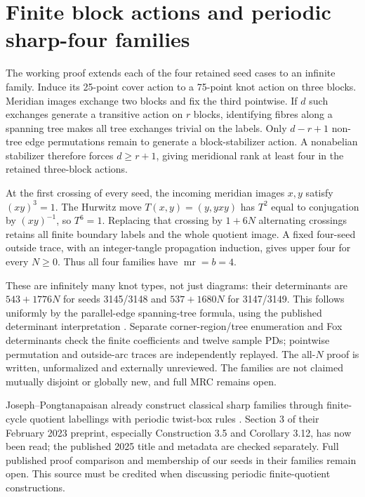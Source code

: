\documentclass[11pt]{article}
\newcommand{\mr}{\operatorname{mr}}
\begin{document}
\section{Finite block actions and periodic sharp-four families}

The working proof  extends
each of the four retained seed cases to an infinite family.
Induce its 25-point cover action to a 75-point knot action
on three blocks. Meridian images exchange two blocks and
fix the third pointwise. If $d$ such exchanges generate a
transitive action on $r$ blocks, identifying fibres along
a spanning tree makes all tree exchanges trivial on the
labels. Only $d-r+1$ non-tree edge permutations remain to
generate a block-stabilizer action. A nonabelian stabilizer
therefore forces $d\ge r+1$, giving meridional rank at least
four in the retained three-block actions.

At the first crossing of every seed, the incoming meridian
images $x,y$ satisfy $(xy)^3=1$. The Hurwitz move
$T(x,y)=(y,yxy)$ has $T^2$ equal to conjugation by $(xy)^{-1}$,
so $T^6=1$. Replacing that crossing by $1+6N$ alternating
crossings retains all finite boundary labels and the whole
quotient image. A fixed four-seed outside trace, with an
integer-tangle propagation induction, gives upper four for
every $N\ge0$. Thus all four families have $\mr=b=4$.

These are infinitely many knot types, not just diagrams:
their determinants are $543+1776N$ for seeds 3145/3148 and
$537+1680N$ for 3147/3149. This follows uniformly by the
parallel-edge spanning-tree formula, using the published
determinant interpretation \cite[Lemma 3.14]{stoim}.
Separate corner-region/tree enumeration and Fox determinants
check the finite coefficients and twelve sample PDs;
pointwise permutation and outside-arc traces are independently
replayed. The all-$N$ proof is written, unformalized and
externally unreviewed. The families are not claimed mutually
disjoint or globally new, and full MRC remains open.

Joseph--Pongtanapaisan already construct classical sharp
families through finite-cycle quotient labellings with
periodic twist-box rules \cite{jp}. Section 3 of their
February 2023 preprint, especially Construction 3.5 and
Corollary 3.12, has now been read; the published 2025 title
and metadata are checked separately. Full published proof
comparison and membership of our seeds in their families
remain open. This source must be credited when discussing
periodic finite-quotient constructions.
\end{document}
